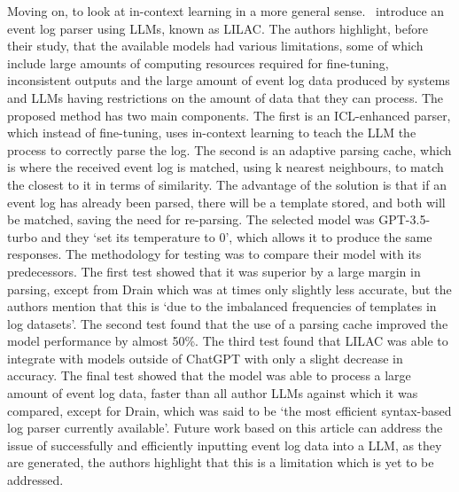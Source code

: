 Moving on, to look at in-context learning in a more general sense.~\cite{jiang2024lilaclogparsingusing} introduce an event log parser using LLMs, known as LILAC. The authors highlight, before their study, that the available models had various limitations, some of which include large amounts of computing resources required for fine-tuning, inconsistent outputs and the large amount of event log data produced by systems and LLMs having restrictions on the amount of data that they can process. The proposed method has two main components. The first is an ICL-enhanced parser, which instead of fine-tuning, uses in-context learning to teach the LLM the process to correctly parse the log. The second is an adaptive parsing cache, which is where the received event log is matched, using k nearest neighbours, to match the closest to it in terms of similarity. The advantage of the solution is that if an event log has already been parsed, there will be a template stored, and both will be matched, saving the need for re-parsing. The selected model was GPT-3.5-turbo and they `set its temperature to 0', which allows it to produce the same responses. The methodology for testing was to compare their model with its predecessors. The first test showed that it was superior by a large margin in parsing, except from Drain which was at times only slightly less accurate, but the authors mention that this is `due to the imbalanced frequencies of templates in log datasets'. The second test found that the use of a parsing cache improved the model performance by almost 50\%. The third test found that LILAC was able to integrate with models outside of ChatGPT with only a slight decrease in accuracy. The final test showed that the model was able to process a large amount of event log data, faster than all author LLMs against which it was compared, except for Drain, which was said to be `the most efficient syntax-based log parser currently available'. Future work based on this article can address the issue of successfully and efficiently inputting event log data into a LLM, as they are generated, the authors highlight that this is a limitation which is yet to be addressed. 

